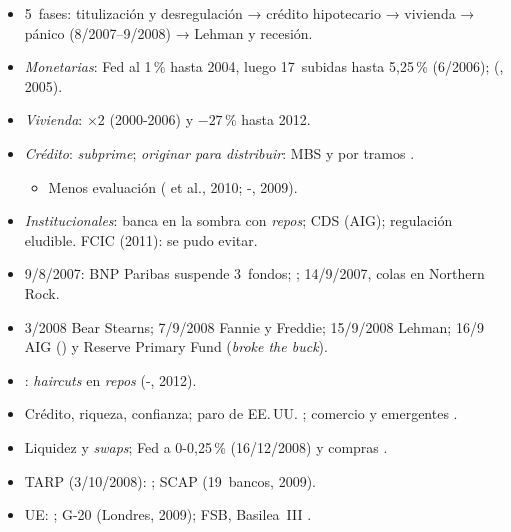 \documentclass{article}
\begin{document}
\begin{columnas}
\begin{itemize}
\item 5~fases: titulización y desregulación → crédito hipotecario → vivienda → pánico (8/2007–9/2008) → Lehman y recesión.
\end{itemize}
\begin{itemize}
\item \emph{Monetarias}: Fed al 1\,\% hasta 2004, luego 17~subidas hasta 5,25\,\% (6/2006);  (, 2005).
\item \emph{Vivienda}: ×2 (2000-2006) y $-27$\,\% hasta 2012.
\item \emph{Crédito}: \emph{subprime}; \emph{originar para distribuir}: MBS y  por tramos .
  \begin{itemize}
  \item Menos evaluación ( et al., 2010; -, 2009).
  \end{itemize}
\item \emph{Institucionales}: banca en la sombra con \emph{repos}; CDS (AIG); regulación eludible. FCIC (2011): se pudo evitar.
\end{itemize}
\begin{itemize}
\item 9/8/2007: BNP Paribas suspende 3~fondos; ; 14/9/2007, colas en Northern Rock.
\item 3/2008 Bear Stearns; 7/9/2008 Fannie y Freddie; 15/9/2008 Lehman; 16/9 AIG () y Reserve Primary Fund (\emph{broke the buck}).
\item {}: \emph{haircuts} en \emph{repos} (-, 2012).
\end{itemize}
\begin{itemize}
\item Crédito, riqueza, confianza; paro de EE.\,UU. ; comercio y emergentes .
\end{itemize}
\begin{itemize}
\item Liquidez y \emph{swaps}; Fed a 0-0,25\,\% (16/12/2008) y compras .
\item TARP (3/10/2008): ; SCAP (19~bancos, 2009).
\item UE: ; G-20 (Londres, 2009); FSB, Basilea~III .

\end{itemize}
\end{columnas}
\end{document}
